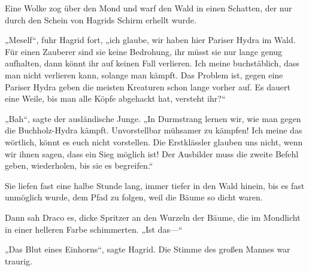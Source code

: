 Eine Wolke zog über den Mond und warf den Wald in einen Schatten, der nur durch den Schein von Hagrids Schirm erhellt wurde.

„Meself“, fuhr Hagrid fort, „ich glaube, wir haben hier Pariser Hydra im Wald. Für einen Zauberer sind sie keine Bedrohung, ihr müsst sie nur lange genug aufhalten, dann könnt ihr auf keinen Fall verlieren. Ich meine buchstäblich, dass man nicht verlieren kann, solange man kämpft. Das Problem ist, gegen eine Pariser Hydra geben die meisten Kreaturen schon lange vorher auf. Es dauert eine Weile, bis man alle Köpfe abgehackt hat, versteht ihr?“

„Bah“, sagte der ausländische Junge. „In Durmstrang lernen wir, wie man gegen die Buchholz-Hydra kämpft. Unvorstellbar mühsamer zu kämpfen! Ich meine das wörtlich, könnt es euch nicht vorstellen. Die Erstklässler glauben uns nicht, wenn wir ihnen sagen, dass ein Sieg möglich ist! Der Ausbilder muss die zweite Befehl geben, wiederholen, bis sie es begreifen.“%

Sie liefen fast eine halbe Stunde lang, immer tiefer in den Wald hinein, bis es fast unmöglich wurde, dem Pfad zu folgen, weil die Bäume so dicht waren.

Dann sah Draco es, dicke Spritzer an den Wurzeln der Bäume, die im Mondlicht in einer helleren Farbe schimmerten.
„Ist das—“

„Das Blut eines Einhorns“, sagte Hagrid. Die Stimme des großen Mannes war traurig.

